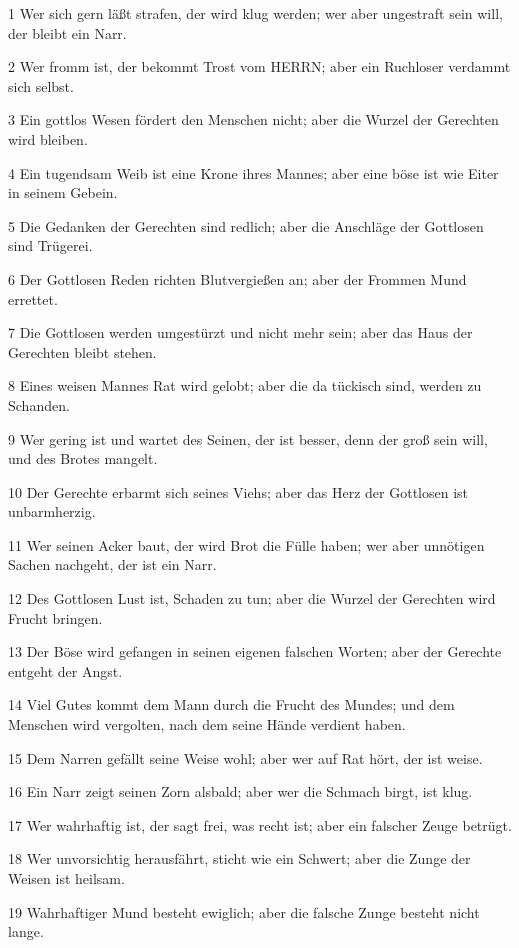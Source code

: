 \par 1 Wer sich gern läßt strafen, der wird klug werden; wer aber ungestraft sein will, der bleibt ein Narr.
\par 2 Wer fromm ist, der bekommt Trost vom HERRN; aber ein Ruchloser verdammt sich selbst.
\par 3 Ein gottlos Wesen fördert den Menschen nicht; aber die Wurzel der Gerechten wird bleiben.
\par 4 Ein tugendsam Weib ist eine Krone ihres Mannes; aber eine böse ist wie Eiter in seinem Gebein.
\par 5 Die Gedanken der Gerechten sind redlich; aber die Anschläge der Gottlosen sind Trügerei.
\par 6 Der Gottlosen Reden richten Blutvergießen an; aber der Frommen Mund errettet.
\par 7 Die Gottlosen werden umgestürzt und nicht mehr sein; aber das Haus der Gerechten bleibt stehen.
\par 8 Eines weisen Mannes Rat wird gelobt; aber die da tückisch sind, werden zu Schanden.
\par 9 Wer gering ist und wartet des Seinen, der ist besser, denn der groß sein will, und des Brotes mangelt.
\par 10 Der Gerechte erbarmt sich seines Viehs; aber das Herz der Gottlosen ist unbarmherzig.
\par 11 Wer seinen Acker baut, der wird Brot die Fülle haben; wer aber unnötigen Sachen nachgeht, der ist ein Narr.
\par 12 Des Gottlosen Lust ist, Schaden zu tun; aber die Wurzel der Gerechten wird Frucht bringen.
\par 13 Der Böse wird gefangen in seinen eigenen falschen Worten; aber der Gerechte entgeht der Angst.
\par 14 Viel Gutes kommt dem Mann durch die Frucht des Mundes; und dem Menschen wird vergolten, nach dem seine Hände verdient haben.
\par 15 Dem Narren gefällt seine Weise wohl; aber wer auf Rat hört, der ist weise.
\par 16 Ein Narr zeigt seinen Zorn alsbald; aber wer die Schmach birgt, ist klug.
\par 17 Wer wahrhaftig ist, der sagt frei, was recht ist; aber ein falscher Zeuge betrügt.
\par 18 Wer unvorsichtig herausfährt, sticht wie ein Schwert; aber die Zunge der Weisen ist heilsam.
\par 19 Wahrhaftiger Mund besteht ewiglich; aber die falsche Zunge besteht nicht lange.
